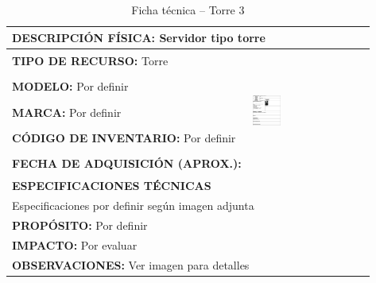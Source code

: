 \begin{table}[H]
\centering
\caption{Ficha técnica -- Torre 3}
\label{tab:torre-3}
\begin{tabular}{|p{}|p{}|}
\hline
\multicolumn{2}{|l|}{\textbf{DESCRIPCIÓN FÍSICA:} Servidor tipo torre} \\ \hline
\textbf{TIPO DE RECURSO:} Torre & 
\multirow{5}{*}{\includegraphics[width=0.25\textwidth,height=4cm,keepaspectratio]{tablas-images/cp1/torres/torre-3.png}} \\ \cline{1-1}
\textbf{MODELO:} Por definir & \\ \cline{1-1}
\textbf{MARCA:} Por definir & \\ \cline{1-1}
\textbf{CÓDIGO DE INVENTARIO:} Por definir & \\ \cline{1-1}
\textbf{FECHA DE ADQUISICIÓN (APROX.):} & \\ \hline
\multicolumn{2}{|l|}{\textbf{ESPECIFICACIONES TÉCNICAS}} \\ \hline
\multicolumn{2}{|p{0.95\textwidth}|}{
\footnotesize
Especificaciones por definir según imagen adjunta
} \\ \hline
\multicolumn{2}{|l|}{\textbf{PROPÓSITO:} Por definir} \\ \hline
\multicolumn{2}{|l|}{\textbf{IMPACTO:} Por evaluar} \\ \hline
\multicolumn{2}{|l|}{\textbf{OBSERVACIONES:} Ver imagen para detalles} \\ \hline
\end{tabular}
\end{table}

